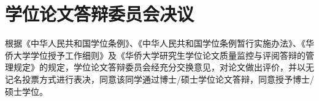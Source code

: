 \documentclass{report}
\begin{document}
\chapter*{学位论文答辩委员会决议}
根据《中华人民共和国学位条例》、《中华人民共和国学位条例暂行实施办法》、《华侨大学学位授予工作细则》及《华侨大学研究生学位论文质量监控与评阅答辩的管理规定》的规定，学位论文答辩委员会经充分交换意见，对论文做出评价，并以无记名投票方式进行表决，同意该同学通过博士/硕士学位论文答辩，同意授予博士/硕士学位。
\end{document}
